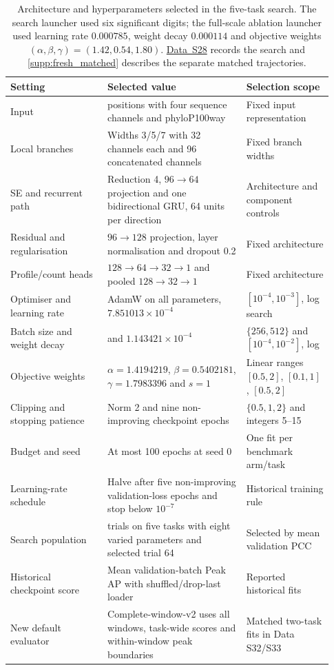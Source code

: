 \documentclass[11pt,a4paper]{article}
\newcommand{\tableid}[1]{\setcounter{table}{\numexpr#1-1\relax}}
\newcommand{\sr}[1]{\ref{#1}}
\newcommand{\data}[1]{\hyperref[data:S#1]{Data~S#1}}
\begin{document}
\tableid{4}
\begin{table}[H]
\centering
\caption{Architecture and hyperparameters selected in the five-task search. The search launcher used six significant digits; the full-scale ablation launcher used learning rate $0.000785$, weight decay $0.000114$ and objective weights $(\alpha,\beta,\gamma)=(1.42,0.54,1.80)$. \data{28} records the search and \sr{supp:fresh_matched} describes the separate matched trajectories.}
\label{tab:selected_configuration}
\small
\begin{tabular}{@{}>{\raggedright\arraybackslash}p{0.28\linewidth}>{\raggedright\arraybackslash}p{0.40\linewidth}>{\raggedright\arraybackslash}p{0.25\linewidth}@{}}
\toprule
Setting & Selected value & Selection scope \\
\midrule
Input & 101 positions with four sequence channels and phyloP100way & Fixed input representation \\
Local branches & Widths 3/5/7 with 32 channels each and 96 concatenated channels & Fixed branch widths \\
SE and recurrent path & Reduction 4, $96\to64$ projection and one bidirectional GRU, 64 units per direction & Architecture and component controls \\
Residual and regularisation & $96\to128$ projection, layer normalisation and dropout 0.2 & Fixed architecture \\
Profile/count heads & $128\to64\to32\to1$ and pooled $128\to32\to1$ & Fixed architecture \\
Optimiser and learning rate & AdamW on all parameters, $7.851013\times10^{-4}$ & $[10^{-4},10^{-3}]$, log search \\
Batch size and weight decay & 256 and $1.143421\times10^{-4}$ & $\{256,512\}$ and $[10^{-4},10^{-2}]$, log \\
Objective weights & $\alpha=1.4194219$, $\beta=0.5402181$, $\gamma=1.7983396$ and $s=1$ & Linear ranges $[0.5,2]$, $[0.1,1]$, $[0.5,2]$ \\
Clipping and stopping patience & Norm 2 and nine non-improving checkpoint epochs & $\{0.5,1,2\}$ and integers 5--15 \\
Budget and seed & At most 100 epochs at seed 0 & One fit per benchmark arm/task \\
Learning-rate schedule & Halve after five non-improving validation-loss epochs and stop below $10^{-7}$ & Historical training rule \\
Search population & 65 trials on five tasks with eight varied parameters and selected trial 64 & Selected by mean validation PCC \\
Historical checkpoint score & Mean validation-batch Peak AP with shuffled/drop-last loader & Reported historical fits \\
New default evaluator & Complete-window-v2 uses all windows, task-wide scores and within-window peak boundaries & Matched two-task fits in Data S32/S33 \\
\bottomrule
\end{tabular}
\end{table}
\end{document}
